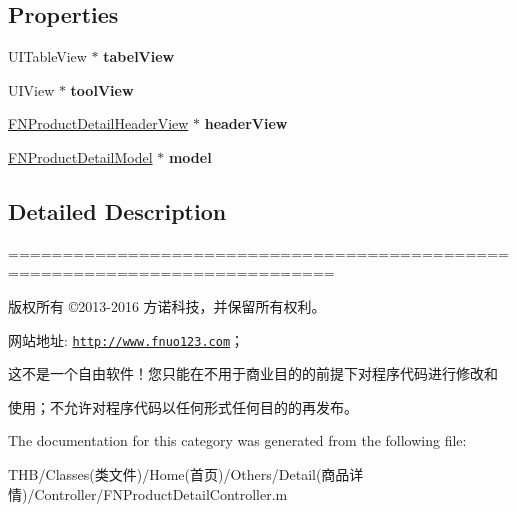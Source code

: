 \subsection*{Properties}
\begin{DoxyCompactItemize}
\item 
\mbox{\label{category_f_n_product_detail_controller_07_08_ae4e57305adc53a53c3ebdb1e1d46bc13}} 
U\+I\+Table\+View $\ast$ {\bfseries tabel\+View}
\item 
\mbox{\label{category_f_n_product_detail_controller_07_08_a510ac58708cbaf2d2664ba817092b5aa}} 
U\+I\+View $\ast$ {\bfseries tool\+View}
\item 
\mbox{\label{category_f_n_product_detail_controller_07_08_a38574576726262302bdc7bfb292af995}} 
\mbox{\hyperlink{interface_f_n_product_detail_header_view}{F\+N\+Product\+Detail\+Header\+View}} $\ast$ {\bfseries header\+View}
\item 
\mbox{\label{category_f_n_product_detail_controller_07_08_acdf148dbfc728002297e53b5eac66a5c}} 
\mbox{\hyperlink{interface_f_n_product_detail_model}{F\+N\+Product\+Detail\+Model}} $\ast$ {\bfseries model}
\end{DoxyCompactItemize}


\subsection{Detailed Description}
============================================================================

版权所有 ©2013-\/2016 方诺科技，并保留所有权利。

网站地址\+: \href{http://www.fnuo123.com}{\tt http\+://www.\+fnuo123.\+com}； 



这不是一个自由软件！您只能在不用于商业目的的前提下对程序代码进行修改和

使用；不允许对程序代码以任何形式任何目的的再发布。 

 

The documentation for this category was generated from the following file\+:\begin{DoxyCompactItemize}
\item 
T\+H\+B/\+Classes(类文件)/\+Home(首页)/\+Others/\+Detail(商品详情)/\+Controller/F\+N\+Product\+Detail\+Controller.\+m\end{DoxyCompactItemize}
